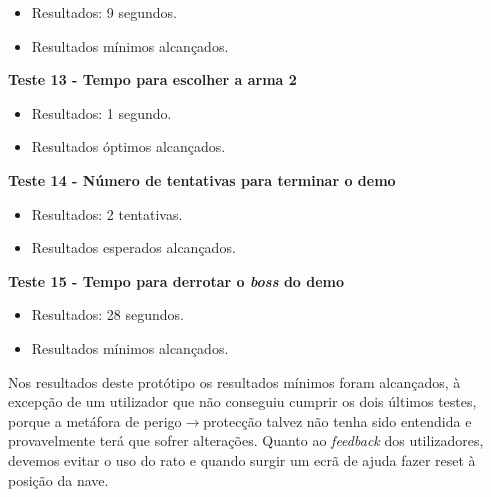 \begin{itemize}

\item Resultados: 9 segundos.

\item Resultados mínimos alcançados.
\end{itemize}

\textbf{Teste 13 - Tempo para escolher a arma 2}

\begin{itemize}

\item Resultados: 1 segundo.

\item Resultados óptimos alcançados.
\end{itemize}

\textbf{Teste 14 - Número de tentativas para terminar o demo}

\begin{itemize}

\item Resultados: 2 tentativas.

\item Resultados esperados alcançados.
\end{itemize}

\textbf{Teste 15 - Tempo para derrotar o \textit{boss} do demo}

\begin{itemize}

\item Resultados: 28 segundos.

\item Resultados mínimos alcançados.
\end{itemize}

Nos resultados deste protótipo os resultados mínimos foram alcançados, à excepção de um utilizador que não conseguiu cumprir os dois últimos testes, porque a metáfora de perigo$\rightarrow$protecção talvez não tenha sido entendida e provavelmente terá que sofrer alterações. Quanto ao \textit{feedback} dos utilizadores, devemos evitar o uso do rato e quando surgir um ecrã de ajuda fazer reset à posição da nave.